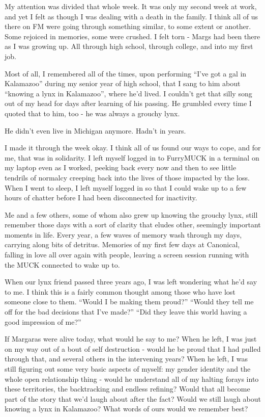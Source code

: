 My attention was divided that whole week. It was only my second week at work, and yet I felt as though I was dealing with a death in the family. I think all of us there on FM were going through something similar, to some extent or another. Some rejoiced in memories, some were crushed. I felt torn - Margs had been there as I was growing up. All through high school, through college, and into my first job.

Most of all, I remembered all of the times, upon performing ``I've got a gal in Kalamazoo'' during my senior year of high school, that I sang to him about ``knowing a lynx in Kalamazoo'', where he'd lived. I couldn't get that silly song out of my head for days after learning of his passing. He grumbled every time I quoted that to him, too - he was always a grouchy lynx.

He didn't even live in Michigan anymore. Hadn't in years.

I made it through the week okay. I think all of us found our ways to cope, and for me, that was in solidarity. I left myself logged in to FurryMUCK in a terminal on my laptop even as I worked, peeking back every now and then to see little tendrils of normalcy creeping back into the lives of those impacted by the loss. When I went to sleep, I left myself logged in so that I could wake up to a few hours of chatter before I had been disconnected for inactivity.

Me and a few others, some of whom also grew up knowing the grouchy lynx, still remember those days with a sort of clarity that eludes other, seemingly important moments in life. Every year, a few waves of memory wash through my days, carrying along bits of detritus. Memories of my first few days at Canonical, falling in love all over again with people, leaving a screen session running with the MUCK connected to wake up to.

When our lynx friend passed three years ago, I was left wondering what he'd say to me. I think this is a fairly common thought among those who have lost someone close to them. ``Would I be making them proud?'' ``Would they tell me off for the bad decisions that I've made?'' ``Did they leave this world having a good impression of me?''

If Margaras were alive today, what would he say to me? When he left, I was just on my way out of a bout of self destruction - would he be proud that I had pulled through that, and several others in the intervening years? When he left, I was still figuring out some very basic aspects of myself: my gender identity and the whole open relationship thing - would he understand all of my halting forays into these territories, the backtracking and endless refining? Would that all become part of the story that we'd laugh about after the fact? Would we still laugh about knowing a lynx in Kalamazoo? What words of ours would we remember best?

